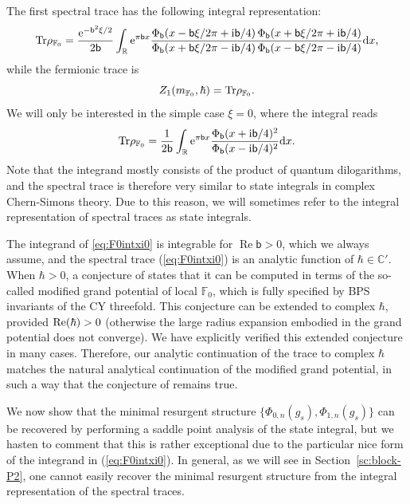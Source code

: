 \documentclass[a4paper,11pt]{article}
\theoremstyle{definition}
\def\IR{{\mathbb R}}
\def\IC{{\mathbb C}}
\def\IF{{\mathbb F}}
\newcommand{\tr}{{\rm Tr}}
\newcommand{\re}{{\rm e}}
\newcommand{\ri}{{\rm i}}
\newcommand{\rd}{{\rm d}}
\newcommand{\mb}{\mathsf{b}}
\newcommand{\bb}{\mathsf{b}}
\newcommand{\fad}{\operatorname{\Phi}_{\mathsf{b}}}
\DeclareMathOperator{\real}{Re}
\begin{document}
The first spectral trace has the following integral representation:
\begin{equation}
  \tr\rho_{\IF_0}=
  \frac{\re^{-\bb^2\xi/2}}{2\bb} \int_{\IR}
  \re^{\pi\bb  x}
  \frac{\fad(x-\bb\xi/2\pi+\ri\bb/4)\fad(x+\bb\xi/2\pi+\ri\bb/4)}
  {\fad(x+\bb\xi/2\pi-\ri\bb/4)\fad(x-\bb\xi/2\pi-\ri\bb/4)}
  \rd x, 
  \label{eq:F0intxi}
\end{equation}
while the fermionic trace is
\begin{equation}
  Z_1(m_{\IF_0},\hbar)= \tr\rho_{\IF_0}.
\end{equation}
We will only be interested in the simple case $\xi = 0$, where the
integral reads
\begin{equation}
  \tr\rho_{\IF_0} =
  \frac{1}{2\bb} \int_{\IR}
  \re^{\pi\bb  x}
  \frac{\fad(x+\ri\bb/4)^2}
  {\fad(x-\ri\bb/4)^2}
  \rd x.\label{eq:F0intxi0}
\end{equation}
Note that the integrand mostly consists of the product of quantum
dilogarithms, and the spectral trace is therefore very similar to state integrals in complex
Chern-Simons theory.  Due to this reason, we will sometimes refer to the
integral representation of spectral traces as state integrals. 

The integrand of \eqref{eq:F0intxi0} is integrable for $\real\mb>0$,
which we always assume, and the spectral trace (\ref{eq:F0intxi0}) is
an analytic function of $\hbar \in \IC'$. When $\hbar>0$, a conjecture
of \cite{ghm} states that it can be computed in terms of the so-called
modified grand potential of local $\IF_0$, which is fully specified by
BPS invariants of the CY threefold. This conjecture can be extended to
complex $\hbar$, provided ${\rm Re}(\hbar)>0$ (otherwise the large
radius expansion embodied in the grand potential does not converge).
We have explicitly verified this extended conjecture in many
cases. Therefore, our analytic continuation of the trace to complex
$\hbar$ matches the natural analytical continuation of the modified
grand potential, in such a way that the conjecture of \cite{ghm}
remains true.

We now show that the minimal resurgent structure
$\{\Phi_{0,n}(g_s), \Phi_{1,n}(g_s)\}$ can be recovered by performing
a saddle point analysis of the state integral, but we hasten to
comment that this is rather exceptional due to the particular nice
form of the integrand in (\ref{eq:F0intxi0}). In general, as we will see in
Section~\ref{sc:block-P2}, one cannot easily recover the minimal
resurgent structure from the integral representation of the spectral
traces.
\end{document}
